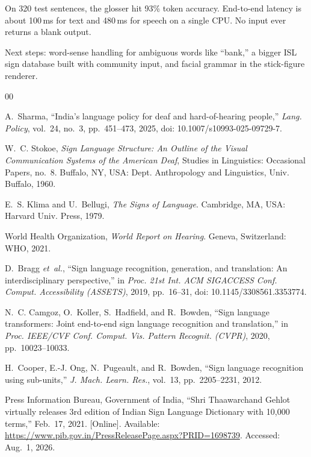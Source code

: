 \documentclass[conference]{IEEEtran}
\begin{document}
On 320 test sentences, the glosser hit 93\% token accuracy. End-to-end latency is about 100\,ms for text and 480\,ms for speech on a single CPU. No input ever returns a blank output.

Next steps: word-sense handling for ambiguous words like ``bank,'' a bigger ISL sign database built with community input, and facial grammar in the stick-figure renderer.



\begin{thebibliography}{00}

A.~Sharma, ``India's language policy for deaf and hard-of-hearing people,'' \emph{Lang. Policy}, vol.~24, no.~3, pp.~451--473, 2025, doi: 10.1007/s10993-025-09729-7.

W.~C. Stokoe, \emph{Sign Language Structure: An Outline of the Visual Communication Systems of the American Deaf}, Studies in Linguistics: Occasional Papers, no.~8. Buffalo, NY, USA: Dept. Anthropology and Linguistics, Univ. Buffalo, 1960.

E.~S. Klima and U.~Bellugi, \emph{The Signs of Language}. Cambridge, MA, USA: Harvard Univ. Press, 1979.

World Health Organization, \emph{World Report on Hearing}. Geneva, Switzerland: WHO, 2021.

D.~Bragg \emph{et~al.}, ``Sign language recognition, generation, and translation: An interdisciplinary perspective,'' in \emph{Proc. 21st Int. ACM SIGACCESS Conf. Comput. Accessibility (ASSETS)}, 2019, pp.~16--31, doi: 10.1145/3308561.3353774.

N.~C. Camgoz, O.~Koller, S.~Hadfield, and R.~Bowden, ``Sign language transformers: Joint end-to-end sign language recognition and translation,'' in \emph{Proc. IEEE/CVF Conf. Comput. Vis. Pattern Recognit. (CVPR)}, 2020, pp.~10023--10033.

H.~Cooper, E.-J. Ong, N.~Pugeault, and R.~Bowden, ``Sign language recognition using sub-units,'' \emph{J. Mach. Learn. Res.}, vol.~13, pp.~2205--2231, 2012.

Press Information Bureau, Government of India, ``Shri Thaawarchand Gehlot virtually releases 3rd edition of Indian Sign Language Dictionary with 10,000 terms,'' Feb.~17, 2021. [Online]. Available: \url{https://www.pib.gov.in/PressReleasePage.aspx?PRID=1698739}. Accessed: Aug.~1, 2026.


\end{thebibliography}
\end{document}
